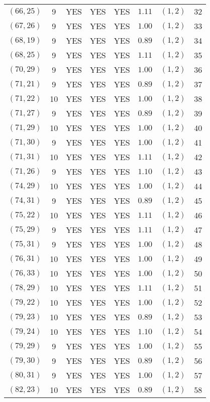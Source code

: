 \begin{longtable}{|c|c|c|c|c|c|c|c|}
$(66,25)$ & 9 & YES & YES & YES & $1.11$ & $(1,2)$ & 32\\
$(67,26)$ & 9 & YES & YES & YES & $1.00$ & $(1,2)$ & 33\\
$(68,19)$ & 9 & YES & YES & YES & $0.89$ & $(1,2)$ & 34\\
$(68,25)$ & 9 & YES & YES & YES & $1.11$ & $(1,2)$ & 35\\
$(70,29)$ & 9 & YES & YES & YES & $1.00$ & $(1,2)$ & 36\\
$(71,21)$ & 9 & YES & YES & YES & $0.89$ & $(1,2)$ & 37\\
$(71,22)$ & 10 & YES & YES & YES & $1.00$ & $(1,2)$ & 38\\
$(71,27)$ & 9 & YES & YES & YES & $0.89$ & $(1,2)$ & 39\\
$(71,29)$ & 10 & YES & YES & YES & $1.00$ & $(1,2)$ & 40\\
$(71,30)$ & 9 & YES & YES & YES & $1.00$ & $(1,2)$ & 41\\
$(71,31)$ & 10 & YES & YES & YES & $1.11$ & $(1,2)$ & 42\\
$(71,26)$ & 9 & YES & YES & YES & $1.10$ & $(1,2)$ & 43\\
$(74,29)$ & 10 & YES & YES & YES & $1.00$ & $(1,2)$ & 44\\
$(74,31)$ & 9 & YES & YES & YES & $0.89$ & $(1,2)$ & 45\\
$(75,22)$ & 10 & YES & YES & YES & $1.11$ & $(1,2)$ & 46\\
$(75,29)$ & 9 & YES & YES & YES & $1.11$ & $(1,2)$ & 47\\
$(75,31)$ & 9 & YES & YES & YES & $1.00$ & $(1,2)$ & 48\\
$(76,31)$ & 10 & YES & YES & YES & $1.00$ & $(1,2)$ & 49\\
$(76,33)$ & 10 & YES & YES & YES & $1.00$ & $(1,2)$ & 50\\
$(78,29)$ & 10 & YES & YES & YES & $1.11$ & $(1,2)$ & 51\\
$(79,22)$ & 10 & YES & YES & YES & $1.00$ & $(1,2)$ & 52\\
$(79,23)$ & 10 & YES & YES & YES & $0.89$ & $(1,2)$ & 53\\
$(79,24)$ & 10 & YES & YES & YES & $1.10$ & $(1,2)$ & 54\\
$(79,29)$ & 9 & YES & YES & YES & $1.00$ & $(1,2)$ & 55\\
$(79,30)$ & 9 & YES & YES & YES & $0.89$ & $(1,2)$ & 56\\
$(80,31)$ & 9 & YES & YES & YES & $1.00$ & $(1,2)$ & 57\\
$(82,23)$ & 10 & YES & YES & YES & $0.89$ & $(1,2)$ & 58\\

\end{longtable}
